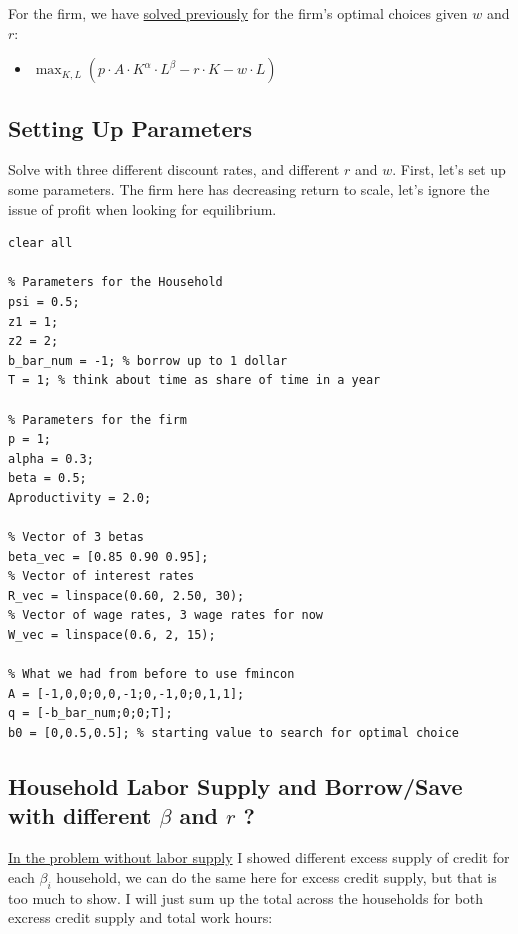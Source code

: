 \documentclass[
]{book}
\providecommand{\tightlist}{%
  \setlength{\itemsep}{0pt}\setlength{\parskip}{0pt}}
\begin{document}
For the firm, we have \href{https://fanwangecon.github.io/Math4Econ/matrix_application/KL_borrowhire_firm.html}{solved
previously}
for the firm's optimal choices given \(w\) and \(r\):

\begin{itemize}
\tightlist
\item
  \(\displaystyle \max_{K,L} \left(p\cdot A\cdot K^{\alpha } \cdot L^{\beta } -r\cdot K-w\cdot L\right)\)
\end{itemize}

\hypertarget{setting-up-parameters}{%
\subsection{Setting Up Parameters}\label{setting-up-parameters}}

Solve with three different discount rates, and different \(r\) and \(w\).
First, let's set up some parameters. The firm here has decreasing return
to scale, let's ignore the issue of profit when looking for equilibrium.

\begin{verbatim}
clear all

% Parameters for the Household
psi = 0.5;
z1 = 1;
z2 = 2;
b_bar_num = -1; % borrow up to 1 dollar
T = 1; % think about time as share of time in a year

% Parameters for the firm
p = 1;
alpha = 0.3;
beta = 0.5;
Aproductivity = 2.0;

% Vector of 3 betas
beta_vec = [0.85 0.90 0.95];
% Vector of interest rates
R_vec = linspace(0.60, 2.50, 30);
% Vector of wage rates, 3 wage rates for now
W_vec = linspace(0.6, 2, 15);

% What we had from before to use fmincon
A = [-1,0,0;0,0,-1;0,-1,0;0,1,1];
q = [-b_bar_num;0;0;T];
b0 = [0,0.5,0.5]; % starting value to search for optimal choice
\end{verbatim}

\hypertarget{household-labor-supply-and-borrowsave-with-different-beta-and-r}{%
\subsection{\texorpdfstring{Household Labor Supply and Borrow/Save with different \(\beta\) and \(r\) ?}{Household Labor Supply and Borrow/Save with different \textbackslash beta and r ?}}\label{household-labor-supply-and-borrowsave-with-different-beta-and-r}}

\href{https://fanwangecon.github.io/Math4Econ/equilibrium/equilibrium_constrainedborrow.html}{In the problem without labor
supply}
I showed different excess supply of credit for each \(\beta_i\) household,
we can do the same here for excess credit supply, but that is too much
to show. I will just sum up the total across the households for both
excress credit supply and total work hours:
\end{document}
